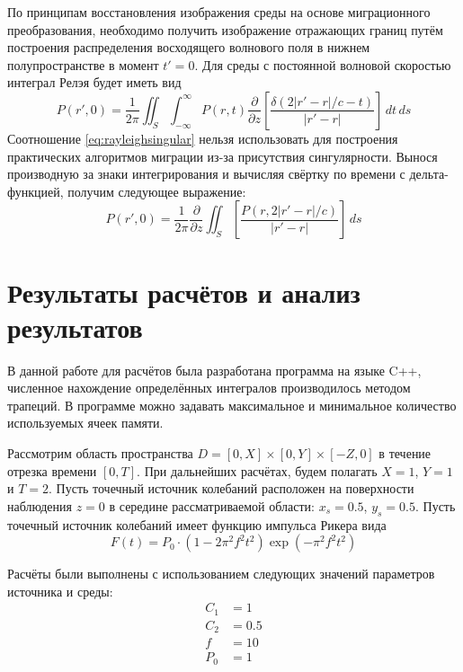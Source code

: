 \documentclass[a4paper, fontsize=14pt]{article}
\begin{document}
	По принципам восстановления изображения среды на основе миграционного преобразования, необходимо получить изображение отражающих границ путём построения распределения восходящего волнового поля в нижнем полупространстве в момент $t' = 0$. Для среды с постоянной волновой скоростью интеграл Релэя будет иметь вид
	\begin{equation}
		P(r',0) = \frac{1}{2\pi} \iint_S \int_{-\infty}^{\infty} P(r,t) \frac{\partial}{\partial z} 
		\left[ \frac{\delta(2|r'-r|/c -t)}{|r'-r|}\right]\,dt\,ds
		\label{eq:rayleighsingular}
	\end{equation}
	Соотношение \ref{eq:rayleighsingular} нельзя использовать для построения практических алгоритмов миграции из-за присутствия сингулярности. Вынося производную за знаки интегрирования и вычисляя свёртку по времени с дельта-функцией, получим следующее выражение:\cite{golubev}
	\begin{equation}
				P(r',0) = \frac{1}{2\pi}\frac{\partial}{\partial z} \iint_S   
		\left[ \frac{P(r,2|r'-r|/c)}{|r'-r|}\right]\,ds
		\label{eq:rayleighgood}
	\end{equation}
	
	\section{Результаты расчётов и анализ результатов}
	В данной работе для расчётов была разработана программа на языке C++, 
	численное нахождение определённых интегралов
	производилось методом трапеций. В программе можно задавать максимальное и минимальное количество используемых ячеек памяти.
	
	Рассмотрим область пространства $D = [0,X]\times [0,Y] \times [-Z,0]$ в течение отрезка времени $[0,T]$. При дальнейших расчётах, будем полагать 
	$X = 1$, $Y=1$ и $T=2$. Пусть точечный источник колебаний расположен на поверхности наблюдения $z=0$ в середине рассматриваемой области: $x_s = 0.5$, $y_s = 0.5$.
	Пусть точечный источник колебаний имеет функцию импульса Рикера вида 
	\begin{equation}
		F(t) = P_0 \cdot (1-2\pi^2 f^2 t^2)\exp(-\pi^2 f^2 t^2)
	\end{equation}  
	
	Расчёты были выполнены с использованием следующих значений параметров источника и среды:
\begin{align*}
	C_1 &= 1 \\
	C_2 &= 0.5 \\
	f &=10 \\
	P_0 & = 1
\end{align*}
\end{document}
